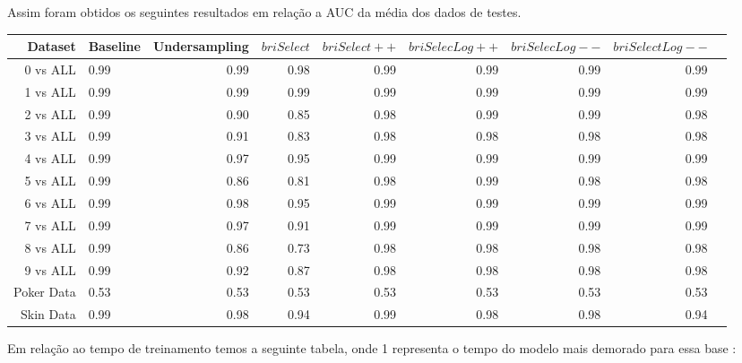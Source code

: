 \documentclass[]{article}
\begin{document}
	Assim foram obtidos os seguintes resultados em relação a AUC da média dos dados de testes.
	
	\begin{table}[H]
		\centering
		\tiny
		\begin{tabular}{rlrrrrrrr}
			\hline
			Dataset & Baseline & Undersampling & $briSelect$ & $briSelect++$ & $briSelecLog++$ & $briSelecLog--$& $briSelectLog--$ \\ 
			\hline
			0 vs ALL & 0.99 & 0.99 & 0.98 & 0.99 & 0.99 & 0.99 & 0.99 \\ 
			1 vs ALL & 0.99 & 0.99 & 0.99 & 0.99 & 0.99 & 0.99 & 0.99 \\ 
			2 vs ALL & 0.99 & 0.90 & 0.85 & 0.98 & 0.99 & 0.99 & 0.98 \\ 
			3 vs ALL & 0.99 & 0.91 & 0.83 & 0.98 & 0.98 & 0.98 & 0.98 \\ 
			4 vs ALL & 0.99 & 0.97 & 0.95 & 0.99 & 0.99 & 0.99 & 0.99 \\ 
			5 vs ALL & 0.99 & 0.86 & 0.81 & 0.98 & 0.99 & 0.98 & 0.98 \\ 
			6 vs ALL & 0.99 & 0.98 & 0.95 & 0.99 & 0.99 & 0.99 & 0.99 \\ 
			7 vs ALL & 0.99 & 0.97 & 0.91 & 0.99 & 0.99 & 0.99 & 0.99 \\ 
			8 vs ALL & 0.99 & 0.86 & 0.73 & 0.98 & 0.98 & 0.98 & 0.98 \\ 
			9 vs ALL & 0.99 & 0.92 & 0.87 & 0.98 & 0.98 & 0.98 & 0.98 \\ 
			Poker Data & 0.53 & 0.53 & 0.53 & 0.53 & 0.53 & 0.53 & 0.53 \\ 
			Skin Data & 0.99 & 0.98 & 0.94 & 0.99 & 0.98 & 0.98 & 0.94 \\ 
			\hline
		\end{tabular}
	\end{table}
	
	Em relação ao tempo de treinamento temos a seguinte tabela, onde 1 representa o tempo do modelo mais demorado para essa base  :
	
\end{document}
